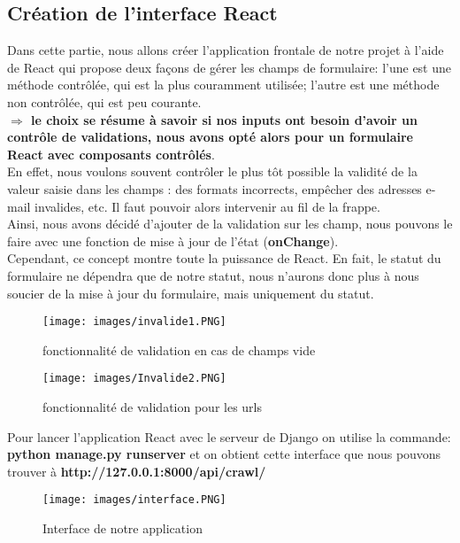 \subsection{Création de l’interface React}
Dans cette partie, nous allons créer l’application frontale de notre projet à l’aide de React qui propose deux façons de gérer les champs de formulaire: l'une est une méthode contrôlée, qui est la plus couramment utilisée; l'autre est une méthode non contrôlée, qui est peu courante.\\
\noindent\textbf{$\Rightarrow$ le choix se résume à savoir si nos inputs ont besoin d'avoir un contrôle de validations, nous avons opté alors pour un formulaire React avec \textbf{composants contrôlés}}.\\
En effet, nous voulons souvent contrôler le plus tôt possible la validité de la valeur saisie dans les champs  : des formats incorrects, empêcher des adresses e-mail invalides, etc. Il faut pouvoir alors intervenir au fil de la frappe.\\
Ainsi, nous avons décidé d'ajouter de la validation sur les champ, nous pouvons le faire avec une fonction de mise à jour de l'état (\textbf{onChange}).\\
Cependant, ce concept montre toute la puissance de React. En fait, le statut du formulaire ne dépendra que de notre statut, nous n'aurons donc plus à nous soucier de la mise à jour du formulaire, mais uniquement du statut.
\begin{figure}[h]
    \begin{minipage}[c]{.45\linewidth}
        \centering
        \texttt{[image: images/invalide1.PNG]}
        \caption{fonctionnalité de validation en cas de champs vide}
    \end{minipage}
    \hfill%
    \begin{minipage}[c]{.45\linewidth}
        \centering
        \texttt{[image: images/Invalide2.PNG]}
        \caption{fonctionnalité de validation pour les urls}
    \end{minipage}
\end{figure}


\newpage
\noindent Pour lancer l'application React avec le serveur de  Django on utilise la commande:\\\textbf{python manage.py runserver} et on obtient cette interface que nous pouvons trouver à \textbf{http://127.0.0.1:8000/api/crawl/}
\begin{figure}[H]
            \centering
            \texttt{[image: images/interface.PNG]}
            \caption{Interface de notre application}
            \label{fig:npm}  
        \end{figure}



